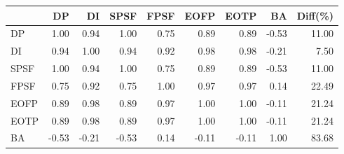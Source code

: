 \begin{tabular}{l|rrrrrrr|r}
\toprule
 & DP & DI & SPSF & FPSF & EOFP & EOTP & BA & Diff(\%)  \\
\midrule
DP & 1.00 & 0.94 & 1.00 & 0.75 & 0.89 & 0.89 & -0.53 & 11.00  \\
DI & 0.94 & 1.00 & 0.94 & 0.92 & 0.98 & 0.98 & -0.21 & 7.50  \\
SPSF & 1.00 & 0.94 & 1.00 & 0.75 & 0.89 & 0.89 & -0.53 & 11.00  \\
FPSF & 0.75 & 0.92 & 0.75 & 1.00 & 0.97 & 0.97 & 0.14 & 22.49  \\
EOFP & 0.89 & 0.98 & 0.89 & 0.97 & 1.00 & 1.00 & -0.11 & 21.24  \\
EOTP & 0.89 & 0.98 & 0.89 & 0.97 & 1.00 & 1.00 & -0.11 & 21.24  \\
BA & -0.53 & -0.21 & -0.53 & 0.14 & -0.11 & -0.11 & 1.00 & 83.68  \\
\bottomrule
\end{tabular}

